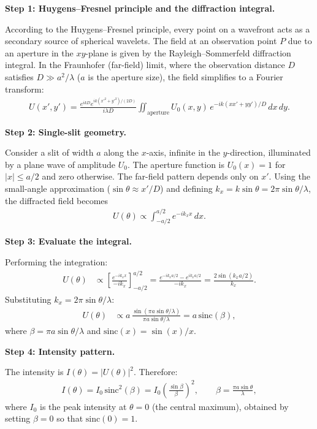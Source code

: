 \textbf{Step 1: Huygens--Fresnel principle and the diffraction integral.}

According to the Huygens--Fresnel principle, every point on a wavefront acts as a secondary source of spherical wavelets. The field at an observation point $P$ due to an aperture in the $xy$-plane is given by the Rayleigh--Sommerfeld diffraction integral. In the Fraunhofer (far-field) limit, where the observation distance $D$ satisfies $D \gg a^2/\lambda$ ($a$ is the aperture size), the field simplifies to a Fourier transform:
\begin{align}
U(x', y') = \frac{e^{ikD}e^{ik(x'^2+y'^2)/(2D)}}{i\lambda D}\iint_{\text{aperture}} U_0(x,y)\,e^{-ik(xx'+yy')/D}\,dx\,dy.
\end{align}

\textbf{Step 2: Single-slit geometry.}

Consider a slit of width $a$ along the $x$-axis, infinite in the $y$-direction, illuminated by a plane wave of amplitude $U_0$. The aperture function is $U_0(x) = 1$ for $|x| \leq a/2$ and zero otherwise. The far-field pattern depends only on $x'$. Using the small-angle approximation ($\sin\theta \approx x'/D$) and defining $k_x = k\sin\theta = 2\pi\sin\theta/\lambda$, the diffracted field becomes
\begin{align}
U(\theta) \propto \int_{-a/2}^{a/2} e^{-ik_x x}\,dx.
\end{align}

\textbf{Step 3: Evaluate the integral.}

Performing the integration:
\begin{align}
U(\theta) &\propto \left[\frac{e^{-ik_x x}}{-ik_x}\right]_{-a/2}^{a/2} = \frac{e^{-ik_x a/2} - e^{ik_x a/2}}{-ik_x} = \frac{2\sin(k_x a/2)}{k_x}.
\end{align}
Substituting $k_x = 2\pi\sin\theta/\lambda$:
\begin{align}
U(\theta) &\propto a\,\frac{\sin(\pi a\sin\theta/\lambda)}{\pi a\sin\theta/\lambda} = a\,\text{sinc}(\beta),
\end{align}
where $\beta = \pi a\sin\theta/\lambda$ and $\text{sinc}(x) = \sin(x)/x$.

\textbf{Step 4: Intensity pattern.}

The intensity is $I(\theta) = |U(\theta)|^2$. Therefore:
\begin{align}
I(\theta) = I_0\,\text{sinc}^2(\beta) = I_0\left(\frac{\sin\beta}{\beta}\right)^{\!2}, \qquad \beta = \frac{\pi a\sin\theta}{\lambda},
\end{align}
where $I_0$ is the peak intensity at $\theta = 0$ (the central maximum), obtained by setting $\beta = 0$ so that $\text{sinc}(0) = 1$.


